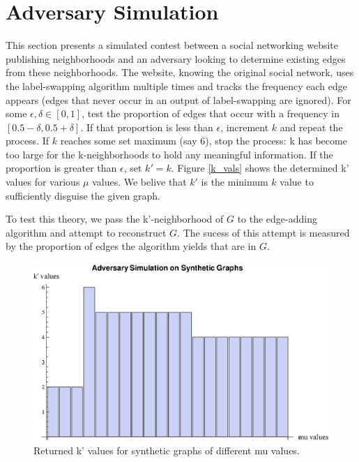 \section{Adversary Simulation}

\noindent This section presents a simulated contest between a social networking website publishing neighborhoods and an adversary looking to determine existing edges from these neighborhoods. The website, knowing the original social network, uses the label-swapping algorithm multiple times and tracks the frequency each edge appears (edges that never occur in an output of label-swapping are ignored). For some $\epsilon,\delta \in [0,1]$, test the proportion of edges that occur with a frequency in $[0.5-\delta,0.5+\delta]$. If that proportion is less than $\epsilon$, increment $k$ and repeat the process. If $k$ reaches some set maximum (say 6), stop the process: k has become too large for the k-neighborhoods to hold any meaningful information. If the proportion is greater than $\epsilon$, set $k' = k$.  Figure \ref{k_vals} shows the determined k' values for various $\mu$ values. We belive that $k'$ is the minimum $k$ value to sufficiently disguise the given graph.

\indent To test this theory, we pass the k'-neighborhood of $G$ to the edge-adding algorithm and attempt to reconstruct $G$. The sucess of this attempt is measured by the proportion of edges the algorithm yields that are in $G$.

\begin{figure}[H]
  \label{k_vals}
  \centering
  \includegraphics[scale=0.8]{k_values.eps}
  \caption{Returned k' values for synthetic graphs of different mu values.}
  \label{fig:k'_values}
\end{figure}